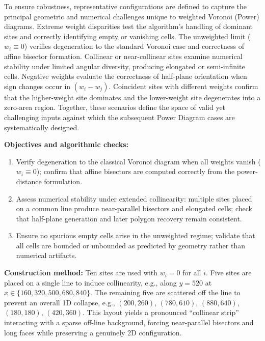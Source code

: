 \documentclass{article}
\begin{document}
To ensure robustness, representative configurations are defined to capture the principal geometric and numerical challenges unique to weighted Voronoi (Power) diagrams.  
Extreme weight disparities test the algorithm’s handling of dominant sites and correctly identifying empty or vanishing cells.  
The unweighted limit (\(w_i\!\equiv\!0\)) verifies degeneration to the standard Voronoi case and correctness of affine bisector formation.  
Collinear or near-collinear sites examine numerical stability under limited angular diversity, producing elongated or semi-infinite cells.  
Negative weights evaluate the correctness of half-plane orientation when sign changes occur in \((w_i-w_j)\).  
Coincident sites with different weights confirm that the higher-weight site dominates and the lower-weight site degenerates into a zero-area region.  
Together, these scenarios define the space of valid yet challenging inputs against which the subsequent Power Diagram cases are systematically designed.


\textbf{Objectives and algorithmic checks:}
\begin{enumerate}
    \item Verify degeneration to the classical Voronoi diagram when all weights vanish ($w_i\equiv 0$); confirm that affine bisectors are computed correctly from the power-distance formulation.
    \item Assess numerical stability under extended collinearity: multiple sites placed on a common line produce near-parallel bisectors and elongated cells; check that half-plane generation and later polygon recovery remain consistent.
    \item Ensure no spurious empty cells arise in the unweighted regime; validate that all cells are bounded or unbounded as predicted by geometry rather than numerical artifacts.
\end{enumerate}

\textbf{Construction method:}
Ten sites are used with $w_i=0$ for all $i$. Five sites are placed on a single line to induce collinearity, e.g., along $y=520$ at $x\in\{160, 320, 500, 680, 840\}$. The remaining five are scattered off the line to prevent an overall 1D collapse, e.g., $(200,260)$, $(780,610)$, $(880,640)$, $(180,180)$, $(420,360)$. This layout yields a pronounced “collinear strip” interacting with a sparse off-line background, forcing near-parallel bisectors and long faces while preserving a genuinely 2D configuration.
\end{document}
